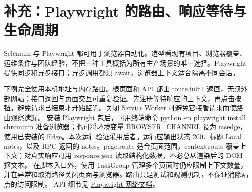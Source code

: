 \section{补充：Playwright 的路由、响应等待与生命周期}\label{rev:crawler:playwright}
Selenium 与 Playwright 都可用于浏览器自动化。选型看现有项目、浏览器覆盖、运维条件与团队经验，不把一种工具概括为所有生产场景的唯一选择。Playwright 提供同步和异步接口；异步调用都须 await，浏览器上下文适合隔离不同会话。

下例完全使用本机地址与内存路由。根页面和 API 都由 route.fulfill 返回，无须外部网站；接口返回与页面交互可重复验证。先注册等待响应的上下文，再点击按钮，避免请求已结束才开始监听。关闭 Service Worker 可避免它接管请求而使路由观察遗漏。
安装 Playwright 包后，可用终端命令 python -m playwright install chromium 准备浏览器；也可将环境变量 BROWSER\_CHANNEL 设为 msedge，使用已安装的 Edge。本次运行验证采用后者。运行应输出状态 200、标题 Local notes，以及 RPC 返回的 notes。page.route 适合页面范围，context.route 覆盖上下文；对真实响应可用 response.json 读取结构化数据，不必总从渲染后的 DOM 抠文本。
在脚本入口外，使用 TaskGroup 管理多个页面时仍应限制上下文数量，并在异常和取消路径关闭页面与浏览器。路由只是测试和观测机制，不保证消除站点的访问限制。
API 细节见 \href{https://playwright.dev/python/docs/network}{Playwright 网络文档}。
